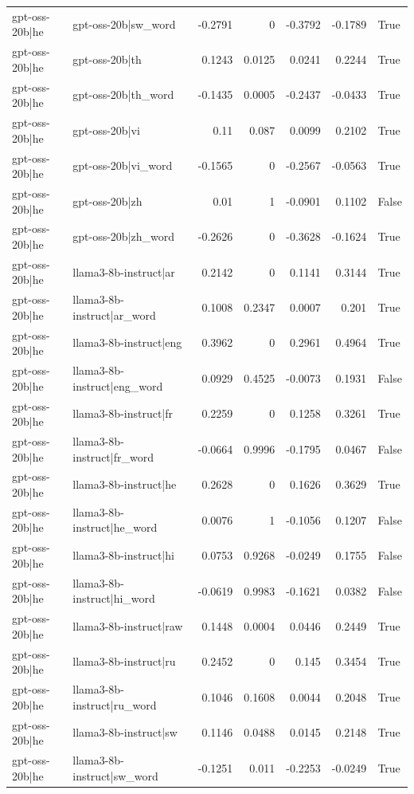 \begin{table}
\begin{tabular}{l l r r r r l}
gpt-oss-20b|he & gpt-oss-20b|sw_word & -0.2791 & 0 & -0.3792 & -0.1789 & True \\
gpt-oss-20b|he & gpt-oss-20b|th & 0.1243 & 0.0125 & 0.0241 & 0.2244 & True \\
gpt-oss-20b|he & gpt-oss-20b|th_word & -0.1435 & 0.0005 & -0.2437 & -0.0433 & True \\
gpt-oss-20b|he & gpt-oss-20b|vi & 0.11 & 0.087 & 0.0099 & 0.2102 & True \\
gpt-oss-20b|he & gpt-oss-20b|vi_word & -0.1565 & 0 & -0.2567 & -0.0563 & True \\
gpt-oss-20b|he & gpt-oss-20b|zh & 0.01 & 1 & -0.0901 & 0.1102 & False \\
gpt-oss-20b|he & gpt-oss-20b|zh_word & -0.2626 & 0 & -0.3628 & -0.1624 & True \\
gpt-oss-20b|he & llama3-8b-instruct|ar & 0.2142 & 0 & 0.1141 & 0.3144 & True \\
gpt-oss-20b|he & llama3-8b-instruct|ar_word & 0.1008 & 0.2347 & 0.0007 & 0.201 & True \\
gpt-oss-20b|he & llama3-8b-instruct|eng & 0.3962 & 0 & 0.2961 & 0.4964 & True \\
gpt-oss-20b|he & llama3-8b-instruct|eng_word & 0.0929 & 0.4525 & -0.0073 & 0.1931 & False \\
gpt-oss-20b|he & llama3-8b-instruct|fr & 0.2259 & 0 & 0.1258 & 0.3261 & True \\
gpt-oss-20b|he & llama3-8b-instruct|fr_word & -0.0664 & 0.9996 & -0.1795 & 0.0467 & False \\
gpt-oss-20b|he & llama3-8b-instruct|he & 0.2628 & 0 & 0.1626 & 0.3629 & True \\
gpt-oss-20b|he & llama3-8b-instruct|he_word & 0.0076 & 1 & -0.1056 & 0.1207 & False \\
gpt-oss-20b|he & llama3-8b-instruct|hi & 0.0753 & 0.9268 & -0.0249 & 0.1755 & False \\
gpt-oss-20b|he & llama3-8b-instruct|hi_word & -0.0619 & 0.9983 & -0.1621 & 0.0382 & False \\
gpt-oss-20b|he & llama3-8b-instruct|raw & 0.1448 & 0.0004 & 0.0446 & 0.2449 & True \\
gpt-oss-20b|he & llama3-8b-instruct|ru & 0.2452 & 0 & 0.145 & 0.3454 & True \\
gpt-oss-20b|he & llama3-8b-instruct|ru_word & 0.1046 & 0.1608 & 0.0044 & 0.2048 & True \\
gpt-oss-20b|he & llama3-8b-instruct|sw & 0.1146 & 0.0488 & 0.0145 & 0.2148 & True \\
gpt-oss-20b|he & llama3-8b-instruct|sw_word & -0.1251 & 0.011 & -0.2253 & -0.0249 & True \\

\end{tabular}
\end{table}
